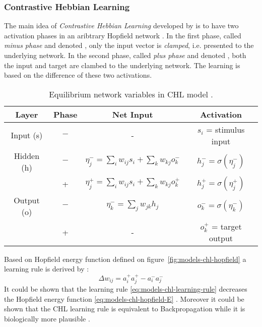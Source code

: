 \subsubsection{Contrastive Hebbian Learning}
\label{models-chl} 


The main idea of \emph{Contrastive Hebbian Learning} developed by \citet{movellan1990contrastive} is to have two activation phases in an aribtrary Hopfield network \citep{hopfield1984neurons}. In the first phase, called \emph{minus phase} and denoted \quotes{-}, only the input vector is \emph{clamped}, i.e. presented to the underlying network. In the second phase, called \emph{plus phase} and denoted \quotes{+}, both the input and target are clambed to the underlying network. The learning is based on the difference of these two activations. 

\begin{table}
  \centering
  \begin{tabular}{|cccc|}
    \hline
    Layer & Phase & Net Input & Activation\\
    \hline
    Input (s)    & $-$ & - & $s_i$ = stimulus input\\
    \hline
    Hidden (h)   & $-$ & \hspace{0.3cm}$\eta^{-}_j = \sum_i w_{ij}s_i + \sum_k w_{kj}o^{-}_k$\hspace{0.3cm} &
    $h^{-}_j = \sigma(\eta^{-}_j)$\hspace{0.3cm}\\
          &  +  & $\eta^{+}_j = \sum_{i}w_{ij}s_i + \sum_k w_{kj}o^{+}_k$ & $h^{+}_{j} = \sigma(\eta^{+}_j)$ \\
    \hline
    Output (o) & $-$ & $\eta^{-}_k = \sum_j w_{jk}h_j$ & $o^{-}_k = \sigma(\eta^{-}_k)$\\
           &  +  & - & $o^{+}_k$ = target output \\
    \hline
  \end{tabular}
  \caption{Equilibrium network variables in CHL model \citep{movellan1990contrastive}.}
  \label{tab:chl-states}
\end{table}


Based on Hopfield energy function defined on figure~\ref{fig:models-chl-hopfield} a learning rule is derived by \citet{movellan1990contrastive}: 
\begin{equation}
\label{eq:models-chl-learning-rule}
\Delta w_{ij} = a_i^{+}a_j^{+} - a_i^{-}a_j^{-}
\end{equation}
It could be shown that the learning rule \ref{eq:models-chl-learning-rule} decreases the Hopfield energy function \ref{eq:models-chl-hopfield-E} \citep{movellan1990contrastive}. Moreover it could be shown that the CHL learning rule is equivalent to Backpropagation while it is biologically more plausible \citep{o1996bio, xie2003equivalence}. 

